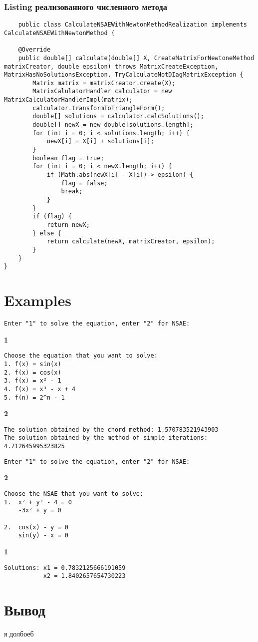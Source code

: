 \subsubsection{Listing реализованного численного метода}
\tiny
\begin{verbatim}
    public class CalculateNSAEWithNewtonMethodRealization implements CalculateNSAEWithNewtonMethod {
    
    @Override
    public double[] calculate(double[] X, CreateMatrixForNewtoneMethod matrixCreator, double epsilon) throws MatrixCreateException, MatrixHasNoSolutionsException, TryCalculateNotDIagMatrixException {
        Matrix matrix = matrixCreator.create(X);
        MatrixCalulatorHandler calculator = new MatrixCalculatorHandlerImpl(matrix);
        calculator.transformToTriangleForm();
        double[] solutions = calculator.calcSolutions();
        double[] newX = new double[solutions.length];
        for (int i = 0; i < solutions.length; i++) {
            newX[i] = X[i] + solutions[i];
        }
        boolean flag = true;
        for (int i = 0; i < newX.length; i++) {
            if (Math.abs(newX[i] - X[i]) > epsilon) {
                flag = false;
                break;
            }
        }
        if (flag) {
            return newX;
        } else {
            return calculate(newX, matrixCreator, epsilon);
        }
    }
}
\end{verbatim}
\normalsize

\section{Examples}
\tiny
\begin{verbatim}
Enter "1" to solve the equation, enter "2" for NSAE:
\end{verbatim}\textbf{1}\begin{verbatim}
Choose the equation that you want to solve:
1. f(x) = sin(x)
2. f(x) = cos(x)
3. f(x) = x² - 1
4. f(x) = x³ - x + 4
5. f(n) = 2^n - 1
\end{verbatim}
\textbf{2}
\begin{verbatim}
The solution obtained by the chord method: 1.570783521943903
The solution obtained by the method of simple iterations: 4.712645995323825
\end{verbatim}

\begin{verbatim}
Enter "1" to solve the equation, enter "2" for NSAE:
\end{verbatim} \textbf{2} \begin{verbatim}
Choose the NSAE that you want to solve:
1.  x² + y² - 4 = 0
    -3x² + y = 0

2.  cos(x) - y = 0
    sin(y) - x = 0
\end{verbatim}
\textbf{1}
\begin{verbatim}
Solutions: x1 = 0.7832125666191059
           x2 = 1.8402657654730223
\end{verbatim}
\normalsize


\section{Вывод}
я долбоеб